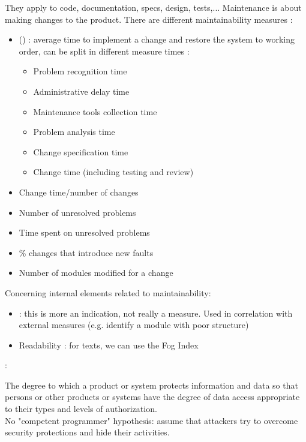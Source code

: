 They apply to code, documentation, specs, design, tests,... Maintenance is about making changes to the product. There are different maintainability measures :
\begin{itemize}
    \item () : average time to implement a change and restore the system to working order, can be split in different measure times :
    \begin{itemize}
        \item Problem recognition time
        \item Administrative delay time
        \item Maintenance tools collection time
        \item Problem analysis time
        \item Change specification time
        \item Change time (including testing and review) 
    \end{itemize}
    \item Change time/number of changes
    \item Number of unresolved problems
    \item Time spent on unresolved problems
    \item \% changes that introduce new faults
    \item Number of modules modified for a change
\end{itemize}

Concerning internal elements related to maintainability:
\begin{itemize}
    \item {} : this is more an indication, not really a measure. Used in correlation with external measures (e.g. identify a module with poor structure)
    \item Readability : for texts, we can use the Fog Index
\end{itemize}


 :

The degree to which a product or system protects information and data so that persons or other products or systems have the degree of data access appropriate to their types and levels of authorization.\\
No "competent programmer" hypothesis: assume that attackers try to overcome security protections and hide their activities.

